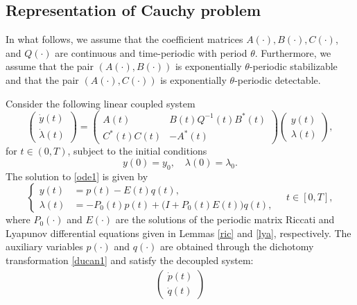 \documentclass{IEEEtran}
\begin{document}
	\subsection{Representation of Cauchy problem}
	In what follows, we assume that the coefficient matrices $A(\cdot), B(\cdot), C(\cdot)$, and $Q(\cdot)$ are continuous and time-periodic with period $\theta$. Furthermore, we assume that the pair $(A(\cdot),B(\cdot))$ is exponentially $\theta$-periodic stabilizable and that the pair $(A(\cdot),C(\cdot))$ is exponentially $\theta$-periodic detectable.
	\begin{theorem}\label{ode0}
		Consider the following linear coupled system
		\begin{equation}\label{ode1}
			\begin{pmatrix}
				\dot{y}(t)\\\dot{\lambda}(t)
			\end{pmatrix}=
			\begin{pmatrix}
				A(t) & B(t)Q^{-1}(t)B^*(t)\\
				C^*(t)C(t)&-A^*(t)
			\end{pmatrix}
			\begin{pmatrix}
				y(t)\\ \lambda (t)
			\end{pmatrix},
		\end{equation}
		for $t\in (0,T)$, subject to the initial conditions
		\begin{equation*}
			y(0)=y_0,\quad \lambda(0)=\lambda_0.
		\end{equation*}
		The solution to \eqref{ode1} is given by
		\begin{equation}
			\left\{
			\begin{aligned}
				y(t) &= p(t)-E(t)q(t),\\
				\lambda(t) &= -P_0(t)p(t)+\big(I+P_0(t)E(t)\big)q(t),
			\end{aligned}
			\right.\quad t\in [0,T],
		\end{equation}
		where $P_0(\cdot)$ and $E(\cdot)$ are the solutions of the periodic matrix Riccati and Lyapunov differential equations given in Lemmas \ref{ric} and \ref{lya}, respectively. The auxiliary variables $p(\cdot)$ and $q(\cdot)$ are obtained through the dichotomy transformation \eqref{ducan1} and satisfy the decoupled system:
		\begin{equation*}
			\begin{split}
				\begin{pmatrix}\dot{p}(t)\\ \dot{q}(t)\end{pmatrix}

\end{split}
\end{equation*}
\end{theorem}
\end{document}

